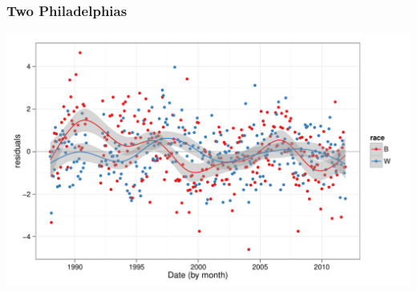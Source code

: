 \documentclass[]{beamer}
\newenvironment{knitrout}{}{} %
\renewenvironment{knitrout}{\begin{footnotesize}}{\end{footnotesize}}
\begin{document}
\begin{frame}[fragile]
\frametitle{Two Philadelphias}






\begin{knitrout}
\color{fgcolor}\includegraphics[width=\linewidth]{figures/murder-unnamed-chunk-12} 
\end{knitrout}

\end{frame}
\end{document}
